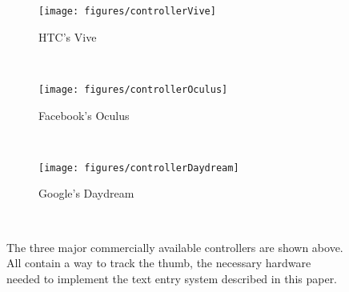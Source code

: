 \begin{figure}
  \centering
  \begin{subfigure}{.4\columnwidth}
  \texttt{[image: figures/controllerVive]}
  \caption{HTC's Vive }\label{fig:controllerVive}
  \end{subfigure}
  \\
  \begin{subfigure}{.4\columnwidth}
  \texttt{[image: figures/controllerOculus]}
  \caption{Facebook's Oculus}\label{fig:controllerOculus}
  \end{subfigure}
  \\
  \begin{subfigure}{.4\columnwidth}
  \texttt{[image: figures/controllerDaydream]}
  \caption{Google's Daydream}\label{fig:controllerDaydream}
  \end{subfigure}
  \caption{
  The three major commercially available controllers are shown above.
  All contain a way to track the thumb, the necessary hardware needed to implement the text entry system described in this paper.
  }~\label{fig:controllers}

\end{figure}



